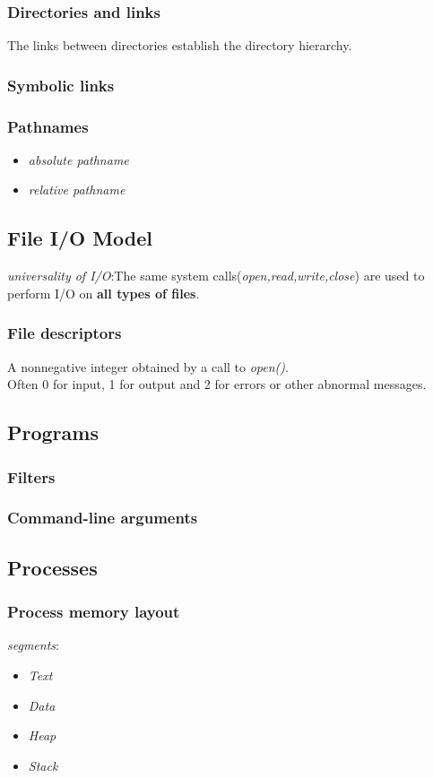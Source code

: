 \documentclass{article}
\numberwithin{equation}{section}
\numberwithin{figure}{section}
\begin{document}
\subsubsection*{Directories and links}
The links between directories establish the directory hierarchy.
\subsubsection*{Symbolic links}
\subsubsection*{Pathnames}
\begin{itemize}
\item \textit{absolute pathname}
\item \textit{relative pathname}
\end{itemize}

\subsection{File I/O Model}
\par\textit{universality of I/O}:The same system calls(\textit{open,read,write,close}) are used to perform I/O on \textbf{all types of files}.
\subsubsection*{File descriptors}
A nonnegative integer obtained by a call to \textit{open()}.\\
Often 0 for input, 1 for output and 2 for errors or other abnormal messages.
\subsection{Programs}
\subsubsection*{Filters}
\subsubsection*{Command-line arguments}

\subsection{Processes}
\subsubsection*{Process memory layout}
\textit{segments}:
\begin{itemize}
\item \textit{Text}
\item \textit{Data}
\item \textit{Heap}
\item \textit{Stack}
\end{itemize}
\end{document}
